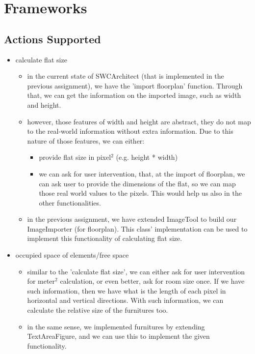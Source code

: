
\section{Frameworks}

\subsection{Actions Supported}

\begin{itemize}
	\item calculate flat size
	\begin{itemize}
		\item in the current state of SWCArchitect (that is implemented in the previous assignment), we have the 'import floorplan' function. Through that, we can get the information on the imported image, such as width and height.
		\item however, those features of width and height are abstract, they do not map to the real-world information without extra information. Due to this nature of those features, we can either:
		\begin{itemize}
			\item provide flat size in pixel$^{2}$ (e.g. height * width)
			\item we can ask for user intervention, that, at the import of floorplan, we can ask user to provide the dimensions of the flat, so we can map those real world values to the pixels. This would help us also in the other functionalities.
		\end{itemize}
		\item in the previous assignment, we have extended ImageTool to build our ImageImporter (for floorplan). This class' implementation can be used to implement this functionality of calculating flat size.
	\end{itemize}
	\bigskip
	
	\item occupied space of elements/free space
	\begin{itemize}
		\item similar to the 'calculate flat size', we can either ask for user intervention for meter$^{2}$ calculation, or even better, ask for room size once. If we have such information, then we have what is the length of each pixel in horizontal and vertical directions. With such information, we can calculate the relative size of the furnitures too.
		\item in the same sense, we implemented furnitures by extending TextAreaFigure, and we can use this to implement the given functionality.
	\end{itemize}
	\bigskip
	

\end{itemize}
